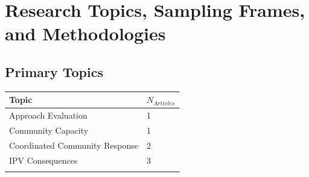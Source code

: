 \documentclass[]{tufte-handout}
\begin{document}
\tufteskip

\newpage

\section{Research Topics, Sampling Frames, and
Methodologies}\label{research-topics-sampling-frames-and-methodologies}

\subsection{Primary Topics}\label{primary-topics}

\begin{longtable}[]{@{}ll@{}}
\toprule
\begin{minipage}[b]{0.50\columnwidth}\raggedright\strut
Topic\strut
\end{minipage} & \begin{minipage}[b]{0.21\columnwidth}\raggedright\strut
\(N_{Articles}\)\strut
\end{minipage}\tabularnewline
\midrule
\endhead
\begin{minipage}[t]{0.50\columnwidth}\raggedright\strut
Approach Evaluation\strut
\end{minipage} & \begin{minipage}[t]{0.21\columnwidth}\raggedright\strut
1\strut
\end{minipage}\tabularnewline
\begin{minipage}[t]{0.50\columnwidth}\raggedright\strut
Community Capacity\strut
\end{minipage} & \begin{minipage}[t]{0.21\columnwidth}\raggedright\strut
1\strut
\end{minipage}\tabularnewline
\begin{minipage}[t]{0.50\columnwidth}\raggedright\strut
Coordinated Community Response\strut
\end{minipage} & \begin{minipage}[t]{0.21\columnwidth}\raggedright\strut
2\strut
\end{minipage}\tabularnewline
\begin{minipage}[t]{0.50\columnwidth}\raggedright\strut
IPV Consequences\strut
\end{minipage} & \begin{minipage}[t]{0.21\columnwidth}\raggedright\strut
3\strut
\end{minipage}\tabularnewline
\begin{minipage}[t]{0.50\columnwidth}\raggedright\strut

\end{minipage}
\end{longtable}
\end{document}
